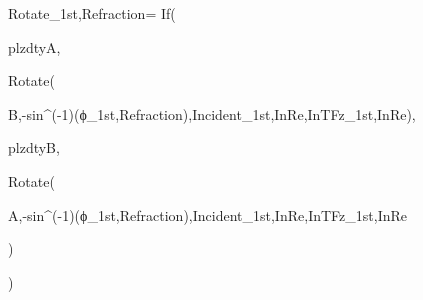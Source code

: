 Rotate_{1st,Refraction}=
If(

  plzdtyA,

  Rotate(

    B,-sin^(-1)(ϕ_{1st,Refraction}),Incident_{1st,InRe},InTFz_{1st,InRe}),
    
  plzdtyB,
    
  Rotate(
    
    A,-sin^(-1)(ϕ_{1st,Refraction}),Incident_{1st,InRe},InTFz_{1st,InRe}
    
  )
  
)